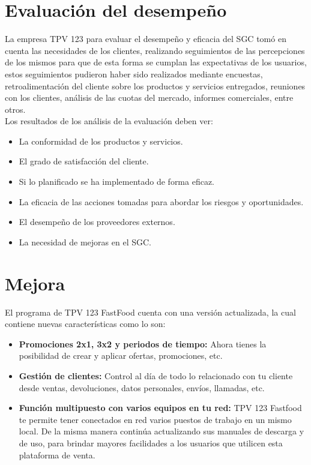 \documentclass[12pt,a4paper]{article}
\begin{document}
 \par\vspace{6cm}
\section{Evaluación del desempeño}\textbf{}
La empresa TPV 123 para evaluar el desempeño y eficacia del SGC tomó en cuenta las necesidades de los clientes, realizando seguimientos de las percepciones de los mismos para que de esta forma se cumplan las expectativas de los usuarios, estos seguimientos pudieron haber sido realizados mediante encuestas, retroalimentación del cliente sobre los productos y servicios entregados, reuniones con los clientes, análisis de las cuotas del mercado, informes comerciales, entre otros.\\

Los resultados de los análisis de la evaluación deben ver:
\begin{itemize}
\item {La conformidad de los productos y servicios.}
\item {El grado de satisfacción del cliente.}
\item {Si lo planificado se ha implementado de forma eficaz.}
\item {La eficacia de las acciones tomadas para abordar los riesgos y oportunidades.}
\item {El desempeño de los proveedores externos.}
\item {La necesidad de mejoras en el SGC.}
\end{itemize}
\section{Mejora}\textbf{}
El programa de TPV 123 FastFood cuenta con una versión actualizada, la cual contiene nuevas características como lo son:\\
\begin{itemize}
\item \textbf {Promociones 2x1, 3x2 y periodos de tiempo:} Ahora tienes la posibilidad de crear y aplicar ofertas, promociones, etc.
\item \textbf {Gestión de clientes:} Control al día de todo lo relacionado con tu cliente desde ventas, devoluciones, datos personales, envíos, llamadas, etc.
\item \textbf {Función multipuesto con varios equipos en tu red:} TPV 123 Fastfood te permite tener conectados en red varios puestos de trabajo en un mismo local.
De la misma manera continúa actualizando sus manuales de descarga y de uso, para brindar mayores facilidades a los usuarios que utilicen esta plataforma de venta.
\end{itemize}
\end{document}
